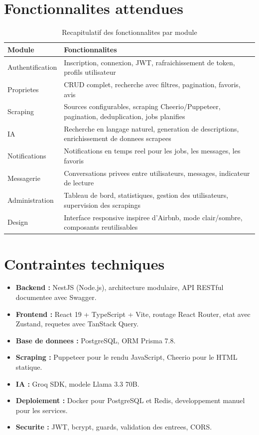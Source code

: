 \documentclass[12pt,a4paper]{report}
\begin{document}
\section{Fonctionnalites attendues}

\begin{table}[H]
\centering
\begin{tabular}{|p{4cm}|p{10cm}|}
\hline
\textbf{Module} & \textbf{Fonctionnalites} \\
\hline
Authentification & Inscription, connexion, JWT, rafraichissement de token, profils utilisateur \\
\hline
Proprietes & CRUD complet, recherche avec filtres, pagination, favoris, avis \\
\hline
Scraping & Sources configurables, scraping Cheerio/Puppeteer, pagination, deduplication, jobs planifies \\
\hline
IA & Recherche en langage naturel, generation de descriptions, enrichissement de donnees scrapees \\
\hline
Notifications & Notifications en temps reel pour les jobs, les messages, les favoris \\
\hline
Messagerie & Conversations privees entre utilisateurs, messages, indicateur de lecture \\
\hline
Administration & Tableau de bord, statistiques, gestion des utilisateurs, supervision des scrapings \\
\hline
Design & Interface responsive inspiree d'Airbnb, mode clair/sombre, composants reutilisables \\
\hline
\end{tabular}
\caption{Recapitulatif des fonctionnalites par module}
\end{table}

\section{Contraintes techniques}

\begin{itemize}
  \item \textbf{Backend :} NestJS (Node.js), architecture modulaire, API RESTful documentee avec Swagger.
  \item \textbf{Frontend :} React 19 + TypeScript + Vite, routage React Router, etat avec Zustand, requetes avec TanStack Query.
  \item \textbf{Base de donnees :} PostgreSQL, ORM Prisma 7.8.
  \item \textbf{Scraping :} Puppeteer pour le rendu JavaScript, Cheerio pour le HTML statique.
  \item \textbf{IA :} Groq SDK, modele Llama 3.3 70B.
  \item \textbf{Deploiement :} Docker pour PostgreSQL et Redis, developpement manuel pour les services.
  \item \textbf{Securite :} JWT, bcrypt, guards, validation des entrees, CORS.
\end{itemize}
\end{document}
